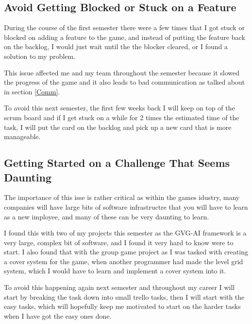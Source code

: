 \documentclass{scrartcl}
\begin{document}
\subsection{Avoid Getting Blocked or Stuck on a Feature} \label{Avoid}

During the course of the first semester there were a few times that I got stuck or blocked on adding a feature to the game, and instead of putting the feature back on the backlog, I would just wait until the the blocker cleared, or I found a solution to my problem.



This issue affected me and my team throughout the semester because it slowed the progress of the game and it also leads to bad communication as talked about in section \ref{Comm}.


To avoid this next semester, the first few weeks back I will keep on top of the scrum board and if I get stuck on a while for 2 times the estimated time of the task, I will put the card on the backlog and pick up a new card that is more manageable.

\par



\subsection{Getting Started on a Challenge That Seems Daunting}
The importance of this isse is rather critical as within the games idustry, many companies will have large bits of software infrastructre that you will have to learn as a new imployee, and many of these can be very daunting to learn.

 I found this with two of my projects this semester as the GVG-AI framework is a very large, complex bit of software, and I found it very hard to know were to start. I also found that with the group game project as I was tasked with creating a cover system for the game, when another programmer had made the level grid system, which I would have to learn and implement a cover system into it.

To avoid this happening again next semester and throughout my career I will start by breaking the task down into small trello tasks, then I will start with the easy tasks, which will hopefully keep me motivated to start on the harder tasks when I have got the easy ones done.
\end{document}
